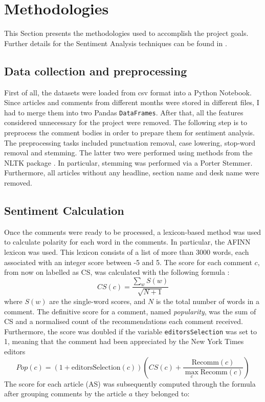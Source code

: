 \section{Methodologies}
\label{Metho}

This Section presents the methodologies used to accomplish the project goals. Further details for the Sentiment Analysis techniques can be found in \cite{Aggarwal}.

\subsection{Data collection and preprocessing}

First of all, the datasets were loaded from csv format into a Python Notebook. Since articles and comments from different months were stored in different files, I had to merge them into two Pandas {\tt DataFrames}. After that, all the features considered unnecessary for the project were removed. 
The following step is to preprocess the comment bodies in order to prepare them for sentiment analysis. The preprocessing tasks included punctuation removal, case lowering, stop-word removal and stemming. The latter two were performed using methods from the NLTK package \cite{NLTK}. In particular, stemming was performed via a Porter Stemmer.
Furthermore, all articles without any headline, section name and desk name were removed.

\subsection{Sentiment Calculation}
Once the comments were ready to be processed, a lexicon-based method was used to calculate polarity for each word in the comments. In particular, the AFINN lexicon \cite{AFINN} was used. This lexicon consists of a list of more than 3000 words, each associated with an integer score between -5 and 5. The score for each comment $c$, from now on labelled as CS, was calculated with the following formula \cite{Guardian}:
\begin{equation}
CS(c) = \frac{\sum_{w} S(w)}{\sqrt{N+1}}
\end{equation}
where $S(w)$ are the single-word scores, and $N$ is the total number of words in a comment. The definitive score for a comment, named \textit{popularity}, was the sum of CS and a normalised count of the recommendations each comment received. Furthermore, the score was doubled if the variable {\tt editorsSelection} was set to 1, meaning that the comment had been appreciated by the New York Times editors
\begin{equation}
\label{Popc}
Pop (c) = (1 + \mbox{editorsSelection} (c) ) \left( CS(c) + \frac{\mbox{Recomm} (c)}{\max_c{\mbox{Recomm}(c)}} \right)
\end{equation}
The score for each article (AS) was subsequently computed through the formula after grouping comments by the article $a$ they belonged to:


